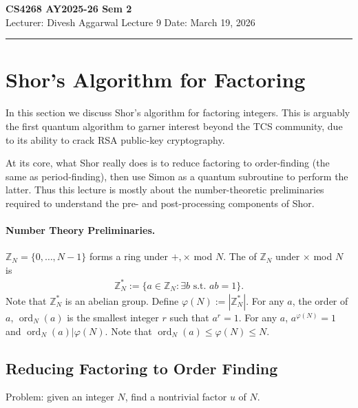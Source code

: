 \noindent
\textbf{CS4268 AY2025-26 Sem 2}
\\
\noindent
Lecturer: Divesh Aggarwal
\hfill
Lecture 9                      %
\hfill
Date: March 19, 2026          %


\noindent
\rule{\textwidth}{1pt}

\medskip


\section{Shor's Algorithm for Factoring}

In this section we discuss Shor's algorithm for factoring integers. This is arguably the first quantum algorithm to garner interest beyond the TCS community, due to its ability to crack RSA public-key cryptography. 

At its core, what Shor really does is to reduce factoring to order-finding (the same as period-finding), then use Simon as a quantum subroutine to perform the latter. Thus this lecture is mostly about the number-theoretic preliminaries required to understand the pre- and post-processing components of Shor. 

\paragraph{Number Theory Preliminaries.} $\mathbb{Z}_N = \{0,\dots, N-1\}$ forms a ring under $+,\times$ mod $N$. The  of $\mathbb{Z}_N$ under $\times$ mod $N$ is
\begin{align*}
    \mathbb{Z}_N^* := \{a \in \mathbb{Z}_N: \exists b \text{ s.t. } ab=1 \}.
\end{align*}
Note that $\mathbb{Z}_N^*$ is an abelian group. Define $\varphi(N):=|\mathbb{Z}_N^*|$. For any $a$, the order of $a$, $\operatorname{ord}_N(a)$ is the smallest integer $r$ such that $a^r=1$. For any $a$, $a^{\varphi(N)}=1$ and $\operatorname{ord}_N(a)|\varphi(N)$. Note that $\operatorname{ord}_N(a) \leq \varphi(N) \leq N$.


\subsection{Reducing Factoring to Order Finding}
Problem: given an integer $N$, find a nontrivial factor $u$ of $N$.

